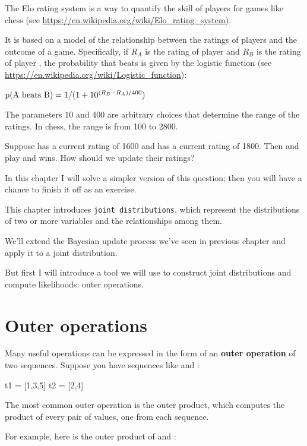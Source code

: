 \documentclass[12pt]{book}
\theoremstyle{exercise}
\begin{document}
The Elo rating system is a way to quantify the skill of players for games like chess (see \url{https://en.wikipedia.org/wiki/Elo_rating_system}).

It is based on a model of the relationship between the ratings of players and the outcome of a game.  
Specifically, if $R_A$ is the rating of player  and $R_B$ is the rating of player , the probability that  beats  is given by the logistic function (see \url{https://en.wikipedia.org/wiki/Logistic_function}):

$\mathrm{p}(\mathrm{A~beats~B}) = 1 / (1 + 10^{(R_B-R_A)/400})$

The parameters $10$ and $400$ are arbitrary choices that determine the range of the ratings.  In chess, the range is from 100 to 2800.

Suppose  has a current rating of 1600 and  has a current rating of 1800.
Then  and  play and  wins.  How should we update their ratings?

In this chapter I will solve a simpler version of this question; then you will have a chance to finish it off as an exercise.

This chapter introduces {\tt joint distributions}, which represent the distributions of two or more variables and the relationships among them.

We'll extend the Bayesian update process we've seen in previous chapter and apply it to a joint distribution.  

But first I will introduce a tool we will use to construct joint distributions and compute likelihoods: outer operations.


\section{Outer operations}
\label{outer-operations}

Many useful operations can be expressed in the form of an {\bf outer operation} of two sequences.
Suppose you have sequences like  and :

\begin{code}
t1 = [1,3,5]
t2 = [2,4]
\end{code}

The most common outer operation is the outer product, which computes the product of every pair of values, one from each sequence.

For example, here is the outer product of  and :
\end{document}
